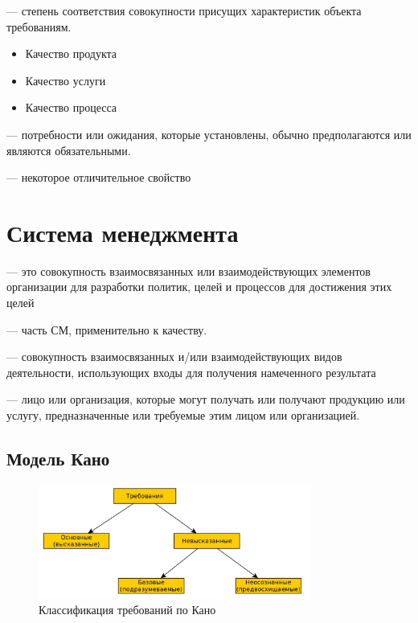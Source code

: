 \documentclass[a4paper, 14pt]{extarticle}
\begin{document}
\begin{tcolorbox}
     --- степень соответствия совокупности присущих характеристик объекта требованиям.
\end{tcolorbox}
\begin{itemize}
    \item Качество продукта
    \item Качество услуги
    \item Качество процесса
\end{itemize}

 — потребности или ожидания, которые установлены, обычно предполагаются или являются обязательными.

 --- некоторое отличительное свойство

\section{Система менеджмента}
 --- это совокупность взаимосвязанных или взаимодействующих элементов организации для разработки политик, целей и процессов для достижения этих целей 

 --- часть СМ, применительно к качеству.

 --- совокупность взаимосвязанных и/или взаимодействующих видов деятельности, использующих входы для получения намеченного результата

 --- лицо или организация, которые могут получать или получают продукцию или услугу, предназначенные или требуемые этим лицом или организацией.

\subsection{Модель Кано}
\begin{figure}[h]
    \centering
    \includegraphics[width=0.8\textwidth]{./img/L2/S001.jpg}
    \caption{Классификация требований по Кано}%
    \label{img:l2:1}
\end{figure}
\end{document}

